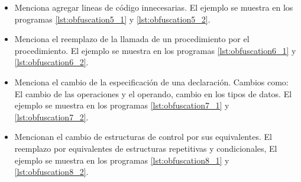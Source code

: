 \begin{itemize}
    \item \cite{Grier1981} Menciona agregar lineas de código innecesarias. El ejemplo se muestra en los programas \ref{lst:obfuscation5_1} y \ref{lst:obfuscation5_2}.
    
    

    \item \cite{WHALE1990131} Menciona el reemplazo de la llamada de un procedimiento por el procedimiento. El ejemplo se muestra en los programas \ref{lst:obfuscation6_1} y \ref{lst:obfuscation6_2}.
    
    

    \item \cite{WHALE1990131} Menciona el cambio de la especificación de una declaración. Cambios como: El cambio de las operaciones y el operando, cambio en los tipos de datos. El ejemplo se muestra en los programas \ref{lst:obfuscation7_1} y \ref{lst:obfuscation7_2}.
    
    

    \item \cite{article3} Mencionan el cambio de estructuras de control por sus equivalentes. El reemplazo por equivalentes de estructuras repetitivas y condicionales, El ejemplo se muestra en los programas \ref{lst:obfuscation8_1} y \ref{lst:obfuscation8_2}.
    
    
\end{itemize}

